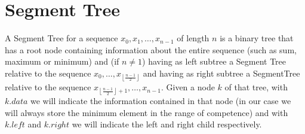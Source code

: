 \documentclass{article}
\begin{document}
\section{Segment Tree}
A Segment Tree for a sequence $x_0,x_1,\dots,x_{n-1}$ of length $n$ is a binary tree that has a root node containing information about the entire sequence (such as sum, maximum or minimum) and (if $n \neq 1$) having as left subtree a Segment Tree relative to the sequence $x_0,\dots,x_{\left\lfloor{\frac{n-1}{2}}\right\rfloor}$ and having as right subtree a SegmentTree relative to the sequence $x_{\left\lfloor{\frac{n-1}{2}}\right\rfloor+1},\dots,x_{n-1}$. Given a node $k$ of that tree, with $\mathit{k.data}$ we will indicate the information contained in that node (in our case we will always store the minimum element in the range of competence) and with $\mathit{k.left}$ and $\mathit{k.right}$ we will indicate the left and right child respectively.
    \begin{center}
        \captionsetup{type=figure, width=.76\linewidth}
    \end{center}
\end{document}
